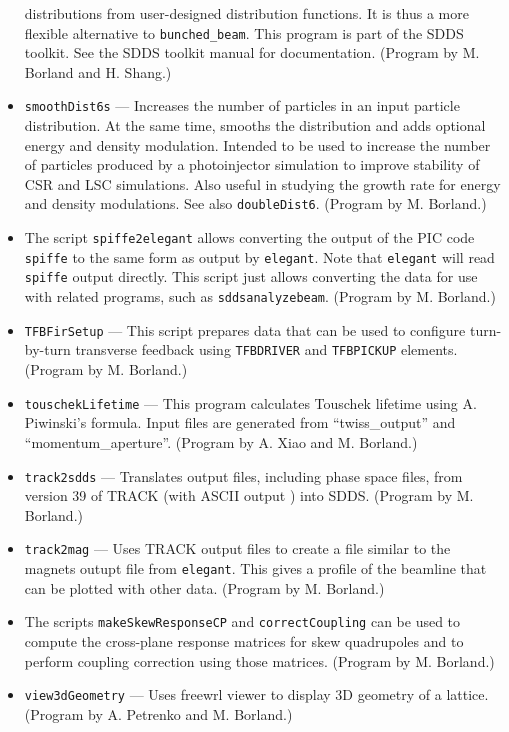 \documentclass[11pt]{article}
\begin{document}
\begin{itemize}
        distributions from user-designed distribution functions.  It is thus a more flexible alternative
        to \verb|bunched_beam|.  This program is part of the SDDS toolkit.  See the SDDS toolkit
        manual for documentation.  (Program by M. Borland and H. Shang.)
\item {\tt smoothDist6s} --- Increases the number of particles in an input particle distribution.  At the same
 time, smooths the distribution and adds optional energy and density modulation.   Intended to be used to increase the number of particles
 produced by a photoinjector simulation to improve stability of CSR and LSC simulations.  Also useful in studying 
 the growth rate for energy and density modulations.  See also {\tt doubleDist6}.
  (Program by M. Borland.)
\item The script \verb|spiffe2elegant| allows converting the output of the PIC code \verb|spiffe| to the same form
  as output by \verb|elegant|.  Note that \verb|elegant| will read \verb|spiffe| output directly. This script just allows converting the
  data for use with related programs, such as \verb|sddsanalyzebeam|.
  (Program by M. Borland.)
\item {\tt TFBFirSetup} --- This script prepares data that can be used to configure turn-by-turn transverse feedback using
  \verb|TFBDRIVER| and \verb|TFBPICKUP| elements.
  (Program by M. Borland.)
\item {\tt touschekLifetime} --- This program calculates Touschek lifetime using A. Piwinski's formula.
        Input files are generated from ``twiss\_output'' and ``momentum\_aperture''.  (Program by A. Xiao and M. Borland.)
\item {\tt track2sdds} --- Translates output files, including phase space files, from version 39 of TRACK (with ASCII output \cite{TRACK})
  into SDDS. 
  (Program by M. Borland.)
\item {\tt track2mag} --- Uses TRACK output files to create a file similar to the magnets outupt file from {\tt elegant}.
  This gives a profile of the beamline that can be plotted with other data.
  (Program by M. Borland.)
\item The scripts \verb|makeSkewResponseCP| and \verb|correctCoupling| can be used to compute the cross-plane response
  matrices for skew quadrupoles and to perform coupling correction using those matrices.
  (Program by M. Borland.)
\item {\tt view3dGeometry} --- Uses freewrl viewer to display 3D geometry of a lattice. 
  (Program by A. Petrenko and M. Borland.)
\end{itemize}
\end{document}
